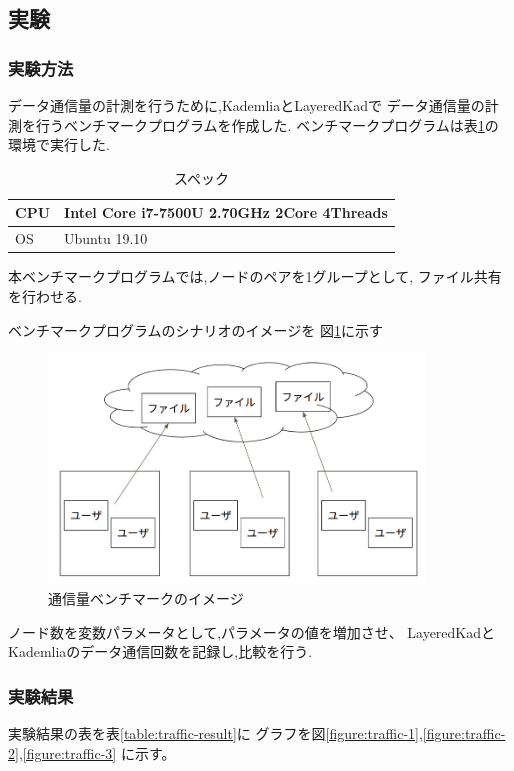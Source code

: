 \documentclass[sotsuron]{jcsie}
\begin{document}
\subsection{実験}
\subsubsection{実験方法}
データ通信量の計測を行うために,KademliaとLayeredKadで
データ通信量の計測を行うベンチマークプログラムを作成した.
ベンチマークプログラムは表\ref{table:spec-note}の環境で実行した.

\begin{table}[H]
	\caption{スペック}	
	\centering
	\label{table:spec-note}
	\begin{tabular}{|l|l|}
		\hline
		CPU &   
		Intel Core i7-7500U 2.70GHz 2Core 4Threads\\ 
		\hline	
		OS  &   
		Ubuntu 19.10 \\ 
		\hline
	\end{tabular}	
\end{table}

本ベンチマークプログラムでは,ノードのペアを1グループとして,
ファイル共有を行わせる.

ベンチマークプログラムのシナリオのイメージを
図\ref{fig:trafficBenchmark}に示す

\begin{figure}[H]
	\centering
	\includegraphics[width=10cm]{./assets/image/traffic_benchmark.png}
	\caption{通信量ベンチマークのイメージ}
	\label{fig:trafficBenchmark}
\end{figure}

ノード数を変数パラメータとして,パラメータの値を増加させ、
LayeredKadとKademliaのデータ通信回数を記録し,比較を行う.

\subsubsection{実験結果}
実験結果の表を表\ref{table:traffic-result}に
グラフを図\ref{figure:traffic-1},\ref{figure:traffic-2},\ref{figure:traffic-3}
に示す。
\end{document}
